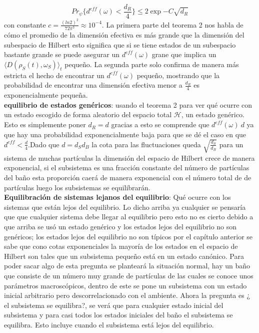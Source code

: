 \begin{equation}
Pr_{\psi} \{ d^{eff}(\omega) < \frac{d_{R}}{4}  \} \leq 2 \exp{-C \sqrt{d_{R}}}
\end{equation}
con constante $c= \frac{(ln 2)^{2}}{72 \pi^{3}} \approx 10^{-4}$.
La primera parte del teorema 2 nos habla de cómo el promedio de la dimensión efectiva es más grande que la dimensión del subespacio de Hilbert esto significa que si se tiene estados de un subespacio bastante grande se puede asegurar un $d^{eff}(\omega)$ grane que implica un $\langle D(\rho_{S}(t) ,\omega_{S}) \rangle_{t}$ pequeño. La segunda parte solo confirma de manera más estricta el hecho de encontrar un $d^{eff}(\omega)$ pequeño, mostrando que la probabilidad de encontrar una dimensión efectiva menor a $\frac{d_{R}}{4}$ es exponencialmente pequeña.\\
\textbf{equilibrio de estados genéricos}:
usando el teorema 2 para ver qué ocurre con un estado escogido de forma aleatorio del espacio total $\mathcal{H}$, un estado genérico. Esto es simplemente poner $d_{R}=d$ gracias a esto se comprende que $d^{eff}(\omega)~d$ ya que  hay una probabilidad exponencialmente baja para que se dé  el caso en que $d^{eff} < \frac{d}{4}$.Dado que $d=d_{S}d_{B}$ la cota para las fluctuaciones queda $\sqrt{\frac{d_{S}}{d_{B}}}$ para un sistema de muchas partículas la dimensión del espacio de Hilbert crece de manera exponencial, si el subsistema es una fracción constante del número de partículas del baño esta proporción caerá de manera exponencial con el número total de de partículas luego los subsistemas se equilibrarán.\\
\textbf{Equilibración de sistemas lejanos del equilibrio}:
Qué ocurre con los sistemas que están lejos del equilibrio. Lo dicho arriba ya cualquier se pensaría que  que cualquier sistema debe llegar al equilibrio pero esto no es cierto debido a que arriba se usó un estado genérico y los estados lejos del equilibrio no son genéricos; los estados lejos del equilibrio no son típicos por el capítulo anterior se sabe que cono cotas exponenciales la mayoría de los estados en el espacio de Hilbert son tales que un subsistema pequeño está en un estado canónico. Para poder sacar algo de esta pregunta se planteará la situación normal, hay un baño que consiste de un número muy grande de partículas de las cuales se conoce unos parámetros macroscópicos, dentro de este se pone un subsistema con un estado inicial arbitrario pero descorrelacionado con el ambiente. Ahora la pregunta es ¿ el subsistema se equilibra?, se verá que para cualquier estado inicial del subsistema y para casi todos los estados iniciales del baño el subsistema se equilibra. Esto incluye cuando el subsistema está lejos del equilibrio.
